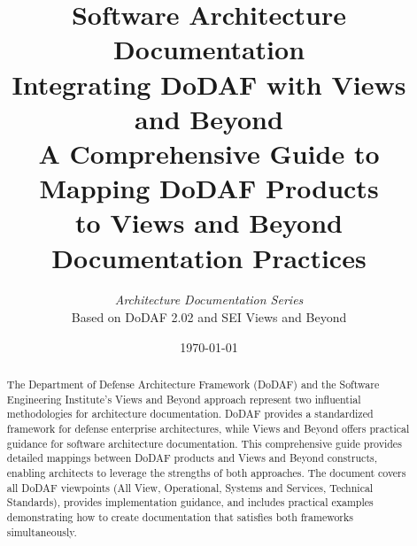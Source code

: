 \documentclass[11pt]{article}
\title{%
    \vspace{-1cm}
    \textbf{\Huge Software Architecture Documentation}\\[12pt]
    \Large Integrating DoDAF with Views and Beyond\\[8pt]
    \large A Comprehensive Guide to Mapping DoDAF Products\\
    to Views and Beyond Documentation Practices
}
\author{%
    \textit{Architecture Documentation Series}\\[4pt]
    \small Based on DoDAF 2.02 and SEI Views and Beyond
}
\date{\today}
\begin{document}
\maketitle
\thispagestyle{empty}

\vspace{0.5cm}

\begin{abstract}
\noindent
The Department of Defense Architecture Framework (DoDAF) and the Software Engineering Institute's Views and Beyond approach represent two influential methodologies for architecture documentation. DoDAF provides a standardized framework for defense enterprise architectures, while Views and Beyond offers practical guidance for software architecture documentation. This comprehensive guide provides detailed mappings between DoDAF products and Views and Beyond constructs, enabling architects to leverage the strengths of both approaches. The document covers all DoDAF viewpoints (All View, Operational, Systems and Services, Technical Standards), provides implementation guidance, and includes practical examples demonstrating how to create documentation that satisfies both frameworks simultaneously.
\end{abstract}

\vfill
\end{document}
